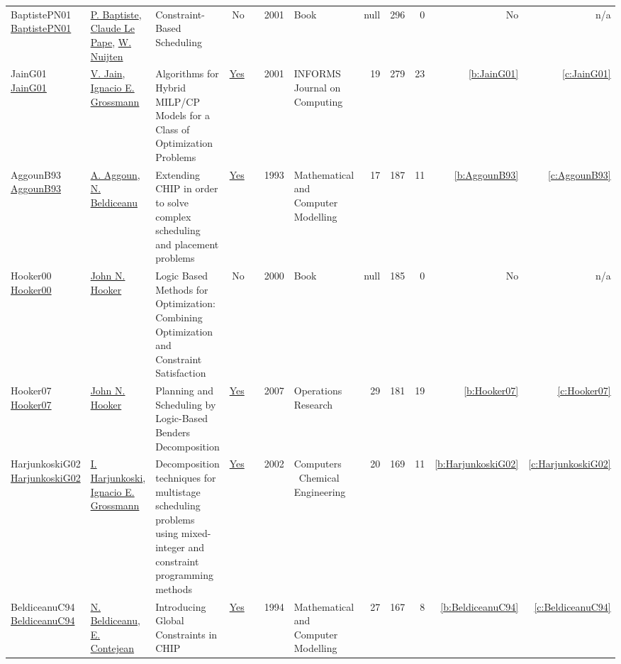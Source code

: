 {\begin{longtable}{>{\raggedright\arraybackslash}p{3cm}>{\raggedright\arraybackslash}p{6cm}>{\raggedright\arraybackslash}p{6.5cm}rrrp{2.5cm}rrrrr}
BaptistePN01 \href{http://dx.doi.org/10.1007/978-1-4615-1479-4}{BaptistePN01} & \hyperref[auth:a164]{P. Baptiste}, \hyperref[auth:a165]{Claude Le Pape}, \hyperref[auth:a666]{W. Nuijten} & Constraint-Based Scheduling & No & \cite{BaptistePN01} & 2001 & Book & null & 296 & 0 & No & n/a\\
JainG01 \href{http://dx.doi.org/10.1287/ijoc.13.4.258.9733}{JainG01} & \hyperref[auth:a856]{V. Jain}, \hyperref[auth:a388]{Ignacio E. Grossmann} & Algorithms for Hybrid MILP/CP Models for a Class of Optimization Problems & \href{../works/JainG01.pdf}{Yes} & \cite{JainG01} & 2001 & INFORMS Journal on Computing & 19 & 279 & 23 & \ref{b:JainG01} & \ref{c:JainG01}\\
AggounB93 \href{https://www.sciencedirect.com/science/article/pii/089571779390068A}{AggounB93} & \hyperref[auth:a734]{A. Aggoun}, \hyperref[auth:a129]{N. Beldiceanu} & Extending {CHIP} in order to solve complex scheduling and placement problems & \href{../works/AggounB93.pdf}{Yes} & \cite{AggounB93} & 1993 & Mathematical and Computer Modelling & 17 & 187 & 11 & \ref{b:AggounB93} & \ref{c:AggounB93}\\
Hooker00 \href{http://dx.doi.org/10.1002/9781118033036}{Hooker00} & \hyperref[auth:a162]{John N. Hooker} & Logic Based Methods for Optimization: Combining Optimization and Constraint Satisfaction & No & \cite{Hooker00} & 2000 & Book & null & 185 & 0 & No & n/a\\
Hooker07 \href{http://dx.doi.org/10.1287/opre.1060.0371}{Hooker07} & \hyperref[auth:a162]{John N. Hooker} & Planning and Scheduling by Logic-Based Benders Decomposition & \href{../works/Hooker07.pdf}{Yes} & \cite{Hooker07} & 2007 & Operations Research & 29 & 181 & 19 & \ref{b:Hooker07} & \ref{c:Hooker07}\\
HarjunkoskiG02 \href{http://dx.doi.org/10.1016/s0098-1354(02)00100-x}{HarjunkoskiG02} & \hyperref[auth:a883]{I. Harjunkoski}, \hyperref[auth:a388]{Ignacio E. Grossmann} & Decomposition techniques for multistage scheduling problems using mixed-integer and constraint programming methods & \href{../works/HarjunkoskiG02.pdf}{Yes} & \cite{HarjunkoskiG02} & 2002 & Computers \  Chemical Engineering & 20 & 169 & 11 & \ref{b:HarjunkoskiG02} & \ref{c:HarjunkoskiG02}\\
BeldiceanuC94 \href{https://www.sciencedirect.com/science/article/pii/0895717794901279}{BeldiceanuC94} & \hyperref[auth:a794]{N. Beldiceanu}, \hyperref[auth:a795]{E. Contejean} & Introducing Global Constraints in {CHIP} & \href{../works/BeldiceanuC94.pdf}{Yes} & \cite{BeldiceanuC94} & 1994 & Mathematical and Computer Modelling & 27 & 167 & 8 & \ref{b:BeldiceanuC94} & \ref{c:BeldiceanuC94}\\

\end{longtable}}
